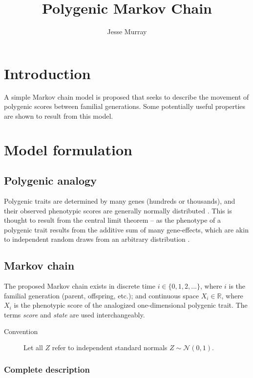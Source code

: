 \documentclass[a4paper,11pt]{article}
\title{Polygenic Markov Chain}
\author{Jesse Murray}
\begin{document}
\maketitle
\thispagestyle{empty}
\newpage
{}

\section{Introduction}
A simple Markov chain model is proposed that seeks to describe the movement of polygenic scores between familial generations. Some potentially useful properties are shown to result from this model. %

\section{Model formulation}

\subsection{Polygenic analogy}

Polygenic traits are determined by many genes (hundreds or thousands), and their observed phenotypic scores are generally normally distributed \cite{lange_article, lange_book}. This is thought to result from the central limit theorem -- as the phenotype of a polygenic trait results from the additive sum of many gene-effects, which are akin to independent random draws from an arbitrary distribution \cite{rieger}.


\subsection{Markov chain}
The proposed Markov chain exists in discrete time $ i \in \{0, 1, 2,...\}$, where $i$ is the familial generation (parent, offspring, etc.); and continuous space $X_i \in \mathbb{R}$, where $X_i$ is the phenotypic score of the analogized one-dimensional polygenic trait. The terms \emph{score} and \emph{state} are used interchangeably. 

\begin{description}
\item [Convention] Let all $Z$ refer to independent standard normals $Z \sim \mathcal{N}(0, 1)$. 
\end{description}

\subsubsection{Complete description}
\end{document}
